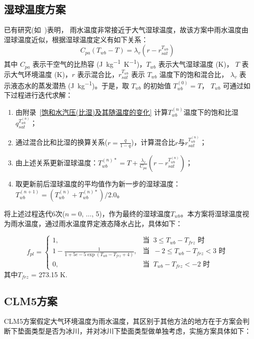 \subsection{湿球温度方案}\label{湿球温度方案}
已有研究(如~\citet{anderson1998moored})表明，
雨水温度非常接近于大气湿球温度，故该方案中雨水温度由湿球温度近似，根据湿球温度定义有如下关系：
\begin{equation}
\label{eq:湿球温度定义}
C_{p a}\left(T_{w b}-T\right)=\lambda_{v}\left(r-r_{s a t}^{T_{w b}}\right)
\end{equation}
其中 $C_{pa}$ 表示干空气的比热容 (\unit{J.kg^{-1}.K^{-1}})，$T_{wb}$ 表示大气湿球温度 (K)，
$T$ 表示大气环境温度 (K)，$r$ 表示混合比，$r_{sat}^{T_{wb}}$ 表示 $T_{wb}$ 温度下的饱和混合比，
$\lambda_v$ 表示液态水的蒸发潜热 (\unit{J.kg^{-1}})。于是，取 $T_{wb}$ 的初始值 $T_{wb}^{\left(0\right)}=T$，
$T_{wb}$ 可通过如下过程进行迭代求解：
\begin{enumerate}
    \item 由附录~\ref{饱和水汽压(比湿)及其随温度的变化} 计算$T_{wb}^{\left(n\right)}$温度下的饱和比湿$q_{sat}^{T_{wb}^{\left(n\right)}}$；
    \item 通过混合比和比湿的换算关系($r=\frac{q}{1-q}$)，计算混合比$r$与$r_{sat}^{T_{wb}^{\left(n\right)}}$；
    \item 由上述关系更新湿球温度：$T_{wb}^{\left(n\right)\ast}=T+\frac{\lambda_v}{C_{pa}}\left(r-r_{sat}^{T_{wb}^{\left(n\right)}}\right)$；
    \item 取更新前后湿球温度的平均值作为新一步的湿球温度：$T_{wb}^{\left(n+1\right)}=\left(T_{wb}^{\left(n\right)}+T_{wb}^{\left(n\right)\ast}\right)/2.0$。
\end{enumerate}
将上述过程迭代6次($n=0$, $\ldots$, 5)，作为最终的湿球温度$T_{wb}$。本方案将湿球温度视为雨水温度，通过雨水温度界定液态降水占比，具体如下：

\begin{equation}
f_{pl}= \begin{cases}
1, & \text{当 }\ 3\leqslant T_{wb} - T_{frz} \text{ 时} \\
1 - \frac{1}{1 + 5e-5\exp{(T_{wb} - T_{frz}+4)}} , & \text{当 }\ -2\leqslant T_{wb} - T_{frz} < 3 \text{ 时} \\
0, & \text{当 }\ T_{wb} - T_{frz} < -2 \text{ 时}
\end{cases}
\end{equation}
%
其中$T_{frz}$ = 273.15 K.


\subsection{CLM5方案}
CLM5方案假定大气环境温度为雨水温度，其区别于其他方法的地方在于方案会判断下垫面类型是否为冰川，并对冰川下垫面类型做单独考虑，实施方案具体如下：

